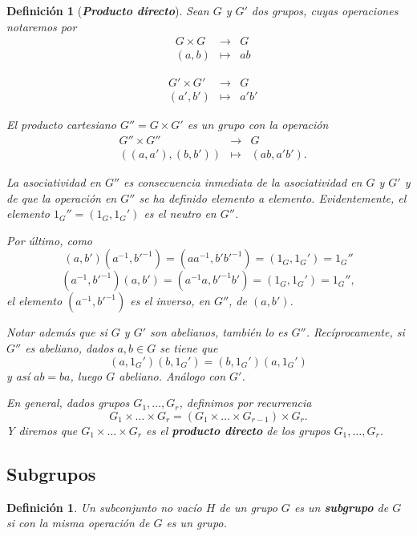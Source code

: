 \documentclass[12pt]{article}
\newtheorem{definition}[theorem]{Definición}
\begin{document}
\begin{definition}[\textbf{\textit{Producto directo}}] Sean $G$ y $G'$ dos grupos, cuyas operaciones notaremos por $$\begin{array}{rccl}
&G \times G & \longrightarrow & G\\
&(a,b) & \longmapsto &ab
\end{array}
$$ 

$$\begin{array}{rccl}
&G' \times G' & \longrightarrow & G\\
&(a',b') & \longmapsto &a'b'
\end{array}
$$

El producto cartesiano $G'' = G \times G'$ es un grupo con la operación $$\begin{array}{rccl}
&G'' \times G'' & \longrightarrow & G\\
&((a,a'),(b,b')) & \longmapsto &(ab, a'b').
\end{array}
$$

La asociatividad en $G''$ es consecuencia inmediata de la asociatividad en $G$ y $G'$ y de que la operación en $G''$ se ha definido elemento a elemento. Evidentemente, el elemento $1_G'' = (1_G, 1_G')$ es el neutro en $G''$. 

Por último, como $$(a,b')(a^{-1}, b'^{-1}) = (aa^{-1}, b'b'^{-1}) = (1_G, 1_G') = 1_G''$$ $$(a^{-1}, b'^{-1}) (a,b') = (a^{-1}a, b'^{-1}b')=(1_G, 1_G') = 1_G'',$$ el elemento $(a^{-1}, b'^{-1})$ es el inverso, en $G''$, de $(a,b')$.

Notar además que si $G$ y $G'$ son abelianos, también lo es $G''$. Recíprocamente, si $G''$ es abeliano, dados $a,b \in G$ se tiene que $$(a, 1_G') (b,1_G') = (b, 1_G')(a, 1_G')$$ y así $ab = ba$, luego $G$ abeliano. Análogo con $G'$.

En general, dados grupos $G_1, \ldots, G_r$, definimos por recurrencia $$G_1 \times \ldots \times G_r = (G_1 \times \ldots \times G_{r-1}) \times G_r.$$ Y diremos que $G_1 \times \ldots \times G_r$ es el \textbf{producto directo} de los grupos $G_1, \ldots, G_r$.
\end{definition}

\subsection{Subgrupos}

\begin{definition}Un subconjunto no vacío $H$ de un grupo $G$ es un \textbf{subgrupo} de $G$ si con la misma operación de $G$ es un grupo.
\end{definition}
\end{document}
